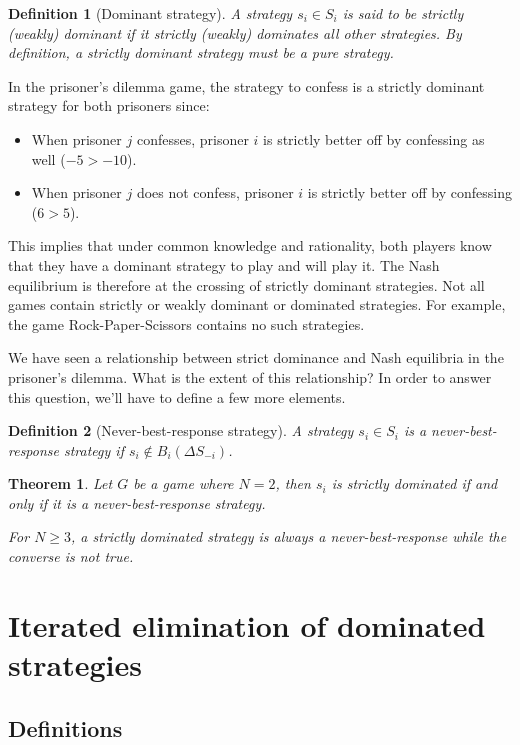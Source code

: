 \documentclass[12pt]{report}
\newtheorem{theorem}{Theorem}[chapter]
\newtheorem{definition}{Definition}[chapter]
\begin{document}
\begin{definition}[Dominant strategy]
A strategy $s_i\in S_i$ is said to be strictly (weakly) dominant if it strictly (weakly) dominates all other strategies. By definition, a strictly dominant strategy must be a pure strategy.
\end{definition}

In the prisoner's dilemma game, the strategy to confess is a strictly dominant strategy for both prisoners since:\begin{itemize}
\item When prisoner $j$ confesses, prisoner $i$ is strictly better off by confessing as well ($-5 > -10$).
\item When prisoner $j$ does not confess, prisoner $i$ is strictly better off by confessing ($6 > 5$).
\end{itemize} This implies that under common knowledge and rationality, both players know that they have a dominant strategy to play and will play it. The Nash equilibrium is therefore at the crossing of strictly dominant strategies. Not all games contain strictly or weakly dominant or dominated strategies. For example, the game Rock-Paper-Scissors contains no such strategies.

We have seen a relationship between strict dominance and Nash equilibria in the prisoner's dilemma. What is the extent of this relationship? In order to answer this question, we'll have to define a few more elements.

\begin{definition}[Never-best-response strategy]
A strategy $s_i\in S_i$ is a never-best-response strategy if $s_i\not\in B_i(\Delta S_{-i})$.
\end{definition}

\begin{theorem}
Let $G$ be a game where $N=2$, then $s_i$ is strictly dominated if and only if it is a never-best-response strategy. 

For $N\geq 3$, a strictly dominated strategy is always a never-best-response while the converse is not true.
\end{theorem}

\section{Iterated elimination of dominated strategies}

\subsection{Definitions}
\end{document}
